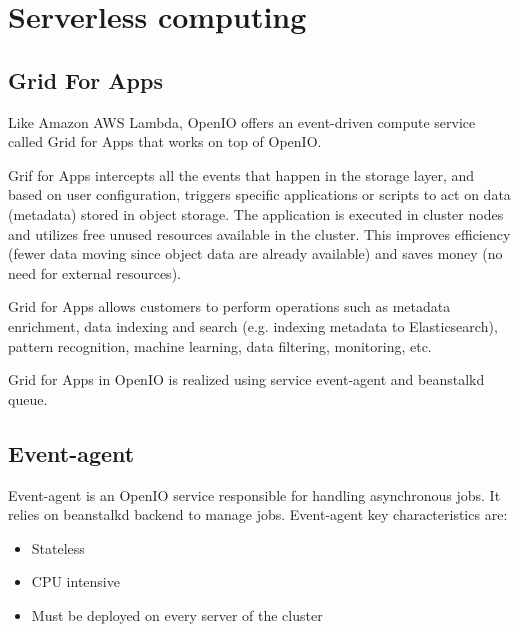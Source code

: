 
    \section{Serverless computing}
    \subsection{Grid For Apps}\label{sec:oioGridForApps}

    Like Amazon AWS Lambda, OpenIO offers an event-driven compute service called Grid for Apps that works on top of OpenIO.

    Grif for Apps intercepts all the events that happen in the storage layer, and based on user configuration, triggers specific applications or scripts to act on data (metadata) stored in object storage\cite{oioNextGen}. The application is executed in cluster nodes and utilizes free unused resources available in the cluster. This improves efficiency (fewer data moving since object data are already available) and saves money (no need for external resources)\cite{oioNextGen}.

    Grid for Apps allows customers to perform operations such as metadata enrichment, data indexing and search (e.g. indexing metadata to Elasticsearch), pattern recognition, machine learning, data filtering, monitoring, etc\cite{oioNextGen}.

    Grid for Apps in OpenIO is realized using service event-agent and beanstalkd queue.

    \subsection{Event-agent}
    Event-agent is an OpenIO service responsible for handling asynchronous jobs. It relies on beanstalkd backend to manage jobs. Event-agent key characteristics are\cite{oioSdsServices}:
    \begin{itemize}
        \item Stateless
        \item CPU intensive
        \item Must be deployed on every server of the cluster
    \end{itemize}

